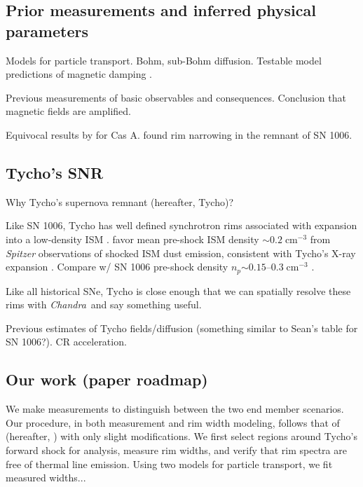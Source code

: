 \documentclass[12pt,preprint]{aastex}  %
\newcommand*{\mt}{\mathrm}
\newcommand*{\unit}[1]{\;\mt{#1}}  %
\newcommand*{\abt}{\mathord{\sim}} %
\newcommand*{\Chandra}{\textit{Chandra}\ }
\begin{document}
\subsection{Prior measurements and inferred physical parameters}

Models for particle transport.  Bohm, sub-Bohm diffusion.
Testable model predictions of magnetic damping \citep{pohl2005}.

Previous measurements of basic observables \citep[e.g.,][]{bamba2003,
bamba2005-hist, bamba2005-vela, parizot2006} and consequences.
Conclusion that magnetic fields are amplified.

Equivocal results by \citet{araya2010} for Cas A.
\citet{ressler2014} found rim narrowing in the remnant of SN 1006.

\subsection{Tycho's SNR}
Why Tycho's supernova remnant (hereafter, Tycho)?

Like SN 1006, Tycho has well defined synchrotron rims associated with expansion
into a low-density ISM .
\citet{williams2013} favor mean pre-shock ISM density $\abt 0.2 \unit{cm^{-3}}$
from \textit{Spitzer} observations of shocked ISM dust emission,
consistent with Tycho's X-ray expansion \citep{katsuda2010}.
Compare w/ SN 1006 pre-shock density $n_p \abt 0.15$--$0.3 \unit{cm^{-3}}$
\citep{raymond2007, heng2007, winkler2013}.  

Like all historical SNe, Tycho is close enough that we
can spatially resolve these rims with \Chandra and say something useful.

Previous estimates of Tycho fields/diffusion (something similar to Sean's table
for SN 1006?).  CR acceleration.

\subsection{Our work (paper roadmap)}

We make measurements to distinguish between the two end member scenarios.
Our procedure, in both measurement and rim width modeling, follows that of
\citet{ressler2014} (hereafter, ) with only slight
modifications.
We first select regions around Tycho's forward shock for analysis, measure
rim widths, and verify that rim spectra are free of thermal line emission.
Using two models for particle transport, we fit measured widths...
\end{document}

